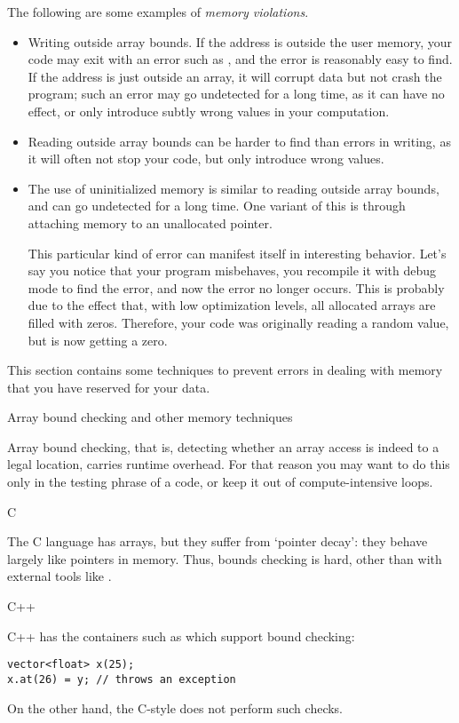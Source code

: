 The following are some examples of \emph{memory violations}.
\begin{itemize}
\item Writing outside array bounds. If the address is outside the user
  memory, your code may exit with an error such as
  , and the error is reasonably easy
  to find. If the address is just outside an array, it will corrupt
  data but not crash the program; such an error may go undetected for
  a long time, as it can have no effect, or only introduce subtly
  wrong values in your computation.
\item Reading outside array bounds can be harder to find than errors
  in writing, as it will often not stop your code, but only introduce
  wrong values.
\item The use of uninitialized memory is similar to reading outside
  array bounds, and can go undetected for a long time. One variant of
  this is through attaching memory to an unallocated pointer.

  This particular kind of error can manifest itself in interesting
  behavior. Let's say you notice that your program misbehaves, you
  recompile it with debug mode to find the error, and now the error no
  longer occurs. This is probably due to the effect that, with low
  optimization levels, all allocated arrays are filled with
  zeros. Therefore, your code was originally reading a random value,
  but is now getting a zero.
\end{itemize}

This section contains some
techniques to prevent errors in dealing with memory that you have
reserved for your data.

 {Array bound checking and other memory techniques}

Array bound checking, that is, detecting whether an array access
is indeed to a legal location, carries runtime overhead.
For that reason you may want to do this only in the testing phrase of a code,
or keep it out of compute-intensive loops.

 {C}

The C language has arrays, but they suffer from `pointer decay':
they behave largely like pointers in memory. Thus, bounds checking
is hard, other than with external tools like .

 {C++}

C++ has the containers such as  which support bound checking:
\begin{lstlisting}
vector<float> x(25);
x.at(26) = y; // throws an exception
\end{lstlisting}
On the other hand, the C-style  does not perform such checks.

